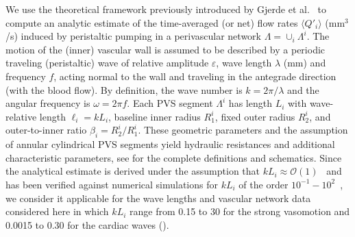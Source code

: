 \documentclass[fleqn,10pt]{wlscirep}
\begin{document}
We use the theoretical framework previously introduced by Gjerde et al.~\cite{gjerde2023directional} to compute an analytic estimate of the time-averaged (or net) flow rates $\langle Q'_i \rangle$ (mm$^3$/s) induced by peristaltic pumping in a perivascular network $\Lambda = \cup_i \Lambda^i$. The motion of the (inner) vascular wall is assumed to be described by a periodic traveling (peristaltic) wave of relative amplitude $\varepsilon$, wave length $\lambda$ (mm) and frequency $f$, acting normal to the wall and traveling in the antegrade direction (with the blood flow). By definition, the wave number is $k = 2 \pi/\lambda$ and the angular frequency is $\omega = 2 \pi f$. Each PVS segment $\Lambda^i$ has length $L_i$ with wave-relative length $\ell_i = k L_i$, baseline inner radius $R_1^i$, fixed outer radius $R_2^i$, and outer-to-inner ratio $\beta_i = R_2^i/R_1^i$. These geometric parameters and the assumption of annular cylindrical PVS segments yield hydraulic resistances and additional characteristic parameters, see \cite{gjerde2023directional} for the complete definitions and schematics. Since the analytical estimate is derived under the assumption that $k L_i \approx \mathcal{O} (1)$~\cite{gjerde2023directional} and has been verified against numerical simulations for $k L_i$ of the order $10^{-1}-10^2$~\cite[Table I]{gjerde2023directional}, we consider it applicable for the wave lengths and vascular network data considered here in which $k L_i$ range from 0.15 to 30 for the strong vasomotion and 0.0015 to 0.30 for the cardiac waves ().
\end{document}
